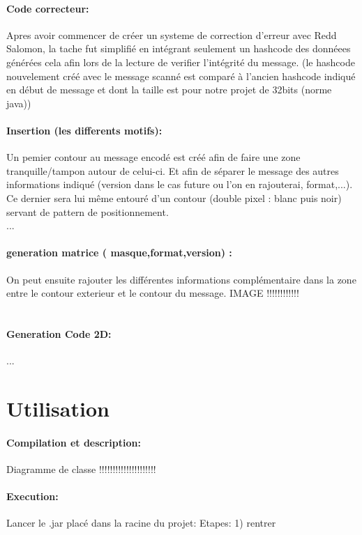 \documentclass{article}
\begin{document}
\subsection{Code correcteur:}
Apres avoir commencer de créer un systeme de correction d'erreur avec Redd Salomon, la tache fut simplifié en intégrant seulement un hashcode des donnéees générées cela afin lors de la lecture de verifier l'intégrité du message. (le hashcode nouvelement créé avec le message scanné est comparé à l'ancien hashcode indiqué en début de message et dont la taille est pour notre projet de 32bits (norme java))
\\
\subsection{Insertion (les differents motifs):}
Un pemier contour au message encodé est créé afin de faire une zone tranquille/tampon autour de celui-ci. Et afin de séparer le message des autres informations indiqué (version dans le cas future ou l'on en rajouterai, format,...). Ce dernier sera lui même entouré d'un contour (double pixel : blanc puis noir) servant de pattern de positionnement.\\
...
\\
\subsection{ generation matrice ( masque,format,version) :}
On peut ensuite rajouter les différentes informations complémentaire dans la zone entre le contour exterieur et le contour du message.
IMAGE !!!!!!!!!!!!\\
\\
\subsection{Generation Code 2D:}
...
\\

\part{Utilisation}
\subsection{Compilation et description:}
Diagramme de classe !!!!!!!!!!!!!!!!!!!!!\\
\subsection{Execution:}
Lancer le .jar placé dans la racine du projet:
Etapes:
1) rentrer
\end{document}
